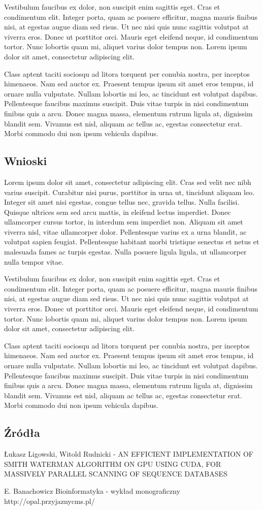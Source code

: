 \documentclass[a4paper,12pt]{article}
\begin{document}
Vestibulum faucibus ex dolor, non suscipit enim sagittis eget. Cras et condimentum elit. Integer porta, quam ac posuere efficitur, magna mauris finibus nisi, at egestas augue diam sed risus. Ut nec nisi quis nunc sagittis volutpat at viverra eros. Donec ut porttitor orci. Mauris eget eleifend neque, id condimentum tortor. Nunc lobortis quam mi, aliquet varius dolor tempus non. Lorem ipsum dolor sit amet, consectetur adipiscing elit.

Class aptent taciti sociosqu ad litora torquent per conubia nostra, per inceptos himenaeos. Nam sed auctor ex. Praesent tempus ipsum sit amet eros tempus, id ornare nulla vulputate. Nullam lobortis mi leo, ac tincidunt est volutpat dapibus. Pellentesque faucibus maximus suscipit. Duis vitae turpis in nisi condimentum finibus quis a arcu. Donec magna massa, elementum rutrum ligula at, dignissim blandit sem. Vivamus est nisl, aliquam ac tellus ac, egestas consectetur erat. Morbi commodo dui non ipsum vehicula dapibus.
\subsection*{Wnioski}
Lorem ipsum dolor sit amet, consectetur adipiscing elit. Cras sed velit nec nibh varius suscipit. Curabitur nisi purus, porttitor in urna ut, tincidunt aliquam leo. Integer sit amet nisi egestas, congue tellus nec, gravida tellus. Nulla facilisi. Quisque ultrices sem sed arcu mattis, in eleifend lectus imperdiet. Donec ullamcorper cursus tortor, in interdum sem imperdiet non. Aliquam sit amet viverra nisl, vitae ullamcorper dolor. Pellentesque varius ex a urna blandit, ac volutpat sapien feugiat. Pellentesque habitant morbi tristique senectus et netus et malesuada fames ac turpis egestas. Nulla posuere ligula ligula, ut ullamcorper nulla tempor vitae.

Vestibulum faucibus ex dolor, non suscipit enim sagittis eget. Cras et condimentum elit. Integer porta, quam ac posuere efficitur, magna mauris finibus nisi, at egestas augue diam sed risus. Ut nec nisi quis nunc sagittis volutpat at viverra eros. Donec ut porttitor orci. Mauris eget eleifend neque, id condimentum tortor. Nunc lobortis quam mi, aliquet varius dolor tempus non. Lorem ipsum dolor sit amet, consectetur adipiscing elit.

Class aptent taciti sociosqu ad litora torquent per conubia nostra, per inceptos himenaeos. Nam sed auctor ex. Praesent tempus ipsum sit amet eros tempus, id ornare nulla vulputate. Nullam lobortis mi leo, ac tincidunt est volutpat dapibus. Pellentesque faucibus maximus suscipit. Duis vitae turpis in nisi condimentum finibus quis a arcu. Donec magna massa, elementum rutrum ligula at, dignissim blandit sem. Vivamus est nisl, aliquam ac tellus ac, egestas consectetur erat. Morbi commodo dui non ipsum vehicula dapibus.

\subsection*{Źródła}
Łukasz Ligowski, Witold Rudnicki - AN EFFICIENT IMPLEMENTATION OF SMITH WATERMAN ALGORITHM ON GPU USING CUDA, FOR MASSIVELY PARALLEL SCANNING OF SEQUENCE DATABASES

E. Banachowicz Bioinformatyka - wykład monograficzny 
http://opal.przyjaznycms.pl/
\end{document}
